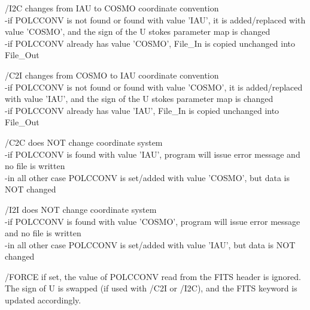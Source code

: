 \begin{keywords}
  \begin{kwlist}{} %
        \item[{/I2C}]   changes from IAU to COSMO coordinate convention \\
            -if POLCCONV is not found or found with value 'IAU', it is
             added/replaced with value 'COSMO', and the sign of the U stokes
             parameter map is changed \\
            -if POLCCONV already has value 'COSMO', File\_In is copied
            unchanged into File\_Out

        \item[{/C2I}]   changes from COSMO to IAU coordinate convention \\
            -if POLCCONV is not found or found with value 'COSMO', it is
             added/replaced with value 'IAU', and the sign of the U stokes
             parameter map is changed \\
            -if POLCCONV already has value 'IAU',  File\_In is copied
            unchanged into File\_Out

        \item[{/C2C}]   does NOT change coordinate system \\
            -if POLCCONV is found with value 'IAU', program will issue error
            message and no file is written \\
            -in all other case POLCCONV is set/added with value 'COSMO', but
             data is NOT changed

        \item[{/I2I}]   does NOT change coordinate system \\
            -if POLCCONV is found with value 'COSMO', program will issue error
            message and no file is written \\
            -in all other case POLCCONV is set/added with value 'IAU', but
             data is NOT changed

        \item[{/FORCE}]   if set, the value of POLCCONV read from the FITS header is
          ignored.
              The sign of U is swapped (if used with /C2I or /I2C), and the
              FITS keyword is updated accordingly.

   \end{kwlist}
\end{keywords}

